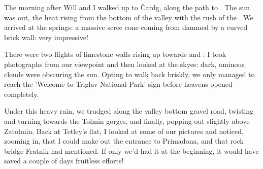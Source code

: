  The morning after Will and I walked up to \v{C}ardg, along the path to . The sun was out, the heat rising from the bottom of the valley with the rush of the . We arrived at the springs: a massive scree cone coming from  dammed by a curved brick wall: very impressive! 
 
There were two flights of limestone walls rising up towards  and : I took photographs from our viewpoint and then looked at the skyes: dark, ominous clouds were obscuring the sun. Opting to walk back briskly, we only managed to reach the 'Welcome to Triglav National Park' sign before heavens opened completely. 

Under this heavy rain, we trudged along the valley bottom gravel road, twisting and turning towards the Tolmin gorges, and finally, popping out slightly above Zatolmin. Back at Tetley's flat, I looked at some of our pictures and noticed, zooming in, that I could make out the entrance to Primadona, and that rock bridge Fratnik had mentioned. If only we'd had it at the beginning, it would have saved a couple of days fruitless efforts! 
 
